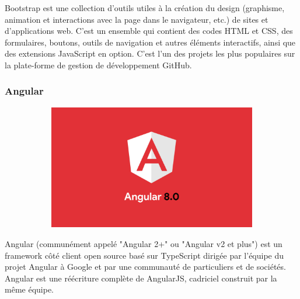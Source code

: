 \documentclass{article}
\begin{document}
Bootstrap est une collection d'outils utiles à la création du design (graphisme, animation et interactions avec la page dans le navigateur, etc.) de sites et d'applications web. C'est un ensemble qui contient des codes HTML et CSS, des formulaires, boutons, outils de navigation et autres éléments interactifs, ainsi que des extensions JavaScript en option. C'est l'un des projets les plus populaires sur la plate-forme de gestion de développement GitHub.

\subsubsection{Angular}

\begin{figure}[h!]
	\centering
  	\begin{subfigure}[b]{0.4\linewidth}
    \includegraphics[width=\linewidth]{Angular.jpeg}
  	\end{subfigure}
\end{figure}

Angular (communément appelé "Angular 2+" ou "Angular v2 et plus") est un framework côté client open source basé sur TypeScript dirigée par l'équipe du projet Angular à Google et par une communauté de particuliers et de sociétés. Angular est une réécriture complète de AngularJS, cadriciel construit par la même équipe. 
\end{document}
